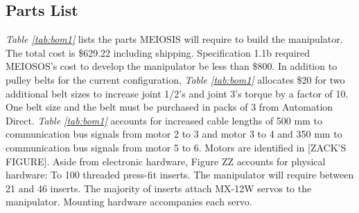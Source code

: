 \subsection{Parts List}
\emph{Table \ref{tab:bom1}} lists the parts MEIOSIS will require to build the manipulator. The total cost is \$629.22 including shipping. Specification 1.1b required MEIOSOS’s cost to develop the manipulator be less than \$800. In addition to pulley belts for the current configuration, \emph{Table \ref{tab:bom1}} allocates \$20 for two additional belt sizes to increase joint 1/2’s and joint 3’s torque by a factor of 10. One belt size and the belt must be purchased in packs of 3 from Automation Direct. \emph{Table \ref{tab:bom1}}  accounts for increased cable lengths of 500 mm to communication bus signals from motor 2 to 3 and motor 3 to 4 and 350 mm to communication bus signals from motor 5 to 6. Motors are identified in [ZACK’S FIGURE]. Aside from electronic hardware, Figure ZZ accounts for physical hardware: To 100 threaded press-fit inserts. The manipulator will require between 21 and 46 inserts. The majority of inserts attach MX-12W servos to the manipulator. Mounting hardware accompanies each servo.

